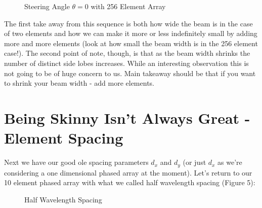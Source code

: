\documentclass[10pt,a5paper]{book}
\begin{document}
\begin{figure}[!htb]
\caption{\label{fig:my-label} Steering Angle $\theta=0$ with 256 Element Array}
\end{figure}

The first take away from this sequence is both how wide the beam is in the case of two elements and how we can make it more or less indefinitely small by adding more and more elements (look at how small the beam width is in the 256 element case!). The second point of note, though, is that as the beam width shrinks the number of distinct side lobes increases. While an interesting observation this is not going to be of huge concern to us. Main takeaway should be that if you want to shrink your beam width - add more elements. 

\section{Being Skinny Isn't Always Great - Element Spacing}
Next we have our good ole spacing parameters $d_x$ and $d_y$ (or just $d_x$ as we're considering a one dimensional phased array at the moment). Let's return to our 10 element phased array with what we called half wavelength spacing (Figure 5):

\begin{figure}[!htb]
\caption{\label{fig:my-label} Half Wavelength Spacing}
\end{figure}
\end{document}
